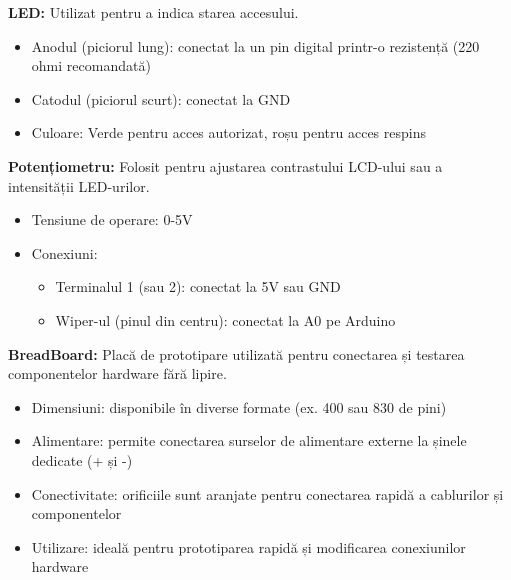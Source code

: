 \documentclass[a4paper,12pt]{report}
\begin{document}
\textbf{LED:} Utilizat pentru a indica starea accesului.
\begin{itemize}
    \item Anodul (piciorul lung): conectat la un pin digital printr-o rezistență (220 ohmi recomandată)
    \item Catodul (piciorul scurt): conectat la GND
    \item Culoare: Verde pentru acces autorizat, roșu pentru acces respins
\end{itemize}

\textbf{Potențiometru:} Folosit pentru ajustarea contrastului LCD-ului sau a intensității LED-urilor.
\begin{itemize}
    \item Tensiune de operare: 0-5V
    \item Conexiuni:
    \begin{itemize}
        \item Terminalul 1 (sau 2): conectat la 5V sau GND
        \item Wiper-ul (pinul din centru): conectat la A0 pe Arduino
    \end{itemize}
\end{itemize}

\textbf{BreadBoard:} Placă de prototipare utilizată pentru conectarea și testarea componentelor hardware fără lipire.
\begin{itemize}
    \item Dimensiuni: disponibile în diverse formate (ex. 400 sau 830 de pini)
    \item Alimentare: permite conectarea surselor de alimentare externe la șinele dedicate (+ și -)
    \item Conectivitate: orificiile sunt aranjate pentru conectarea rapidă a cablurilor și componentelor
    \item Utilizare: ideală pentru prototiparea rapidă și modificarea conexiunilor hardware
\end{itemize}
\end{document}
